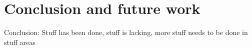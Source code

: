 \section{Conclusion and future work}

Conclusion: Stuff has been done, stuff is lacking, more stuff needs to be done in stuff areas
